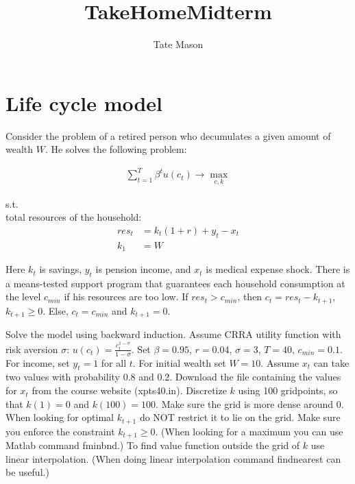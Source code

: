 \documentclass[10pt,a4paper]{article}
\begin{document}
\title{TakeHomeMidterm}
\author{Tate Mason}
\date{}
\maketitle

\section*{Life cycle model}
Consider the problem of a retired person who decumulates a given amount
of wealth $W$. He solves the following problem:

\begin{align*}
    \sum_{t=1}^{T} \beta^t u(c_t) \rightarrow \max_{c,k}
\end{align*}

s.t.\\
total resources of the household:
\begin{align*}
    res_t &= k_t(1 + r) + y_t - x_t\\
    k_1 &= W
\end{align*}

Here $k_t$ is savings, $y_t$ is pension income, and $x_t$ is medical expense shock.
There is a means-tested support program that guarantees each household
consumption at the level $c_{min}$ if his resources are too low. If $res_t > c_{min}$,
then $c_t = res_t - k_{t+1}$, $k_{t+1} \geq 0$. Else, $c_t = c_{min}$ and $k_{t+1} = 0$.

Solve the model using backward induction. Assume CRRA utility function with risk aversion $\sigma$: $u(c_t) = \frac{c_t^{1-\sigma}}{1-\sigma}$. Set $\beta = 0.95$, $r = 0.04$, $\sigma = 3$, $T = 40$, $c_{min} = 0.1$. For income, set $y_t = 1$ for all $t$. For initial wealth set $W = 10$.
Assume $x_t$ can take two values with probability 0.8 and 0.2. Download the
file containing the values for $x_t$ from the course website (xpts40.in). Discretize $k$ using 100 gridpoints, so that $k(1) = 0$ and $k(100) = 100$. Make sure
the grid is more dense around 0. When looking for optimal $k_{t+1}$ do NOT
restrict it to lie on the grid. Make sure you enforce the constraint $k_{t+1} \geq 0$.
(When looking for a maximum you can use Matlab command fminbnd.) To
find value function outside the grid of $k$ use linear interpolation. (When
doing linear interpolation command findnearest can be useful.)
\end{document}
